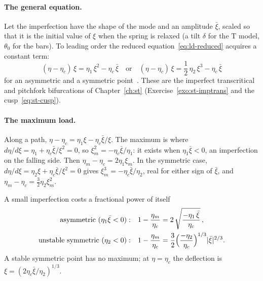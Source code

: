 \paragraph{The general equation.}
Let the imperfection have the shape of the mode and an amplitude $\bar\xi$, scaled
so that it is the initial value of $\xi$ when the spring is relaxed (a tilt $\delta$
for the T model, $\theta_0$ for the bars). To leading order the reduced
equation~\eqref{eq:ld-reduced} acquires a constant term:
\begin{equation}\label{eq:ld-imperfect-path}
  (\eta - \eta_c)\,\xi = \eta_1\,\xi^2 - \eta_c\,\bar\xi
  \quad\text{or}\quad
  (\eta - \eta_c)\,\xi = \frac12\,\eta_2\,\xi^3 - \eta_c\,\bar\xi
\end{equation}
for an asymmetric and a symmetric point~\cite[pp.~65--70]{ld-triantafyllidis2011}.
These are the imperfect transcritical and pitchfork bifurcations of
Chapter~\ref{ch:st} (Exercise~\ref{exo:st-imptrans} and the cusp~\eqref{eq:st-cusp}).

\paragraph{The maximum load.}
Along a path, $\eta - \eta_c = \eta_1\xi - \eta_c\bar\xi/\xi$. The maximum is where
$d\eta/d\xi = \eta_1 + \eta_c\bar\xi/\xi^2 = 0$, so $\xi_m^2 = -\eta_c\bar\xi/\eta_1$:
it exists when $\eta_1\bar\xi < 0$, an imperfection on the falling side. Then
$\eta_m - \eta_c = 2\eta_1\xi_m$. In the symmetric case,
$d\eta/d\xi = \eta_2\xi + \eta_c\bar\xi/\xi^2 = 0$ gives $\xi_m^3 = -\eta_c\bar\xi/\eta_2$,
real for either sign of $\bar\xi$, and $\eta_m - \eta_c = \tfrac32\eta_2\xi_m^2$.

\begin{gbox}{A small imperfection costs a fractional power of itself}\label{sec:ld-powerlaws}
%
\begin{align}
  \text{asymmetric } (\eta_1\bar\xi < 0):\quad
    & 1 - \frac{\eta_m}{\eta_c} = 2\,\sqrt{\frac{-\eta_1\,\bar\xi}{\eta_c}}\,, \label{eq:ld-half}\\
  \text{unstable symmetric } (\eta_2 < 0):\quad
    & 1 - \frac{\eta_m}{\eta_c} = \frac32\Bigl(\frac{-\eta_2}{\eta_c}\Bigr)^{1/3}\lvert \bar\xi\rvert^{2/3}. \label{eq:ld-twothirds}
\end{align}
A stable symmetric point has no maximum; at $\eta = \eta_c$ the deflection is
$\xi = (2\eta_c\bar\xi/\eta_2)^{1/3}$.
\end{gbox}

